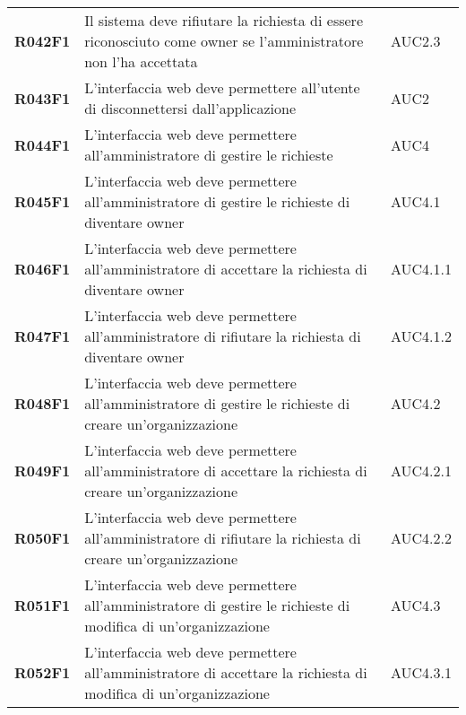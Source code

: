 \documentclass[../analisi-dei-requisiti.tex]{subfiles}
\begin{document}
\begin{longtable}[H]{>{\centering\bfseries}m{3cm} >{\centering}m{10cm} >{\centering\arraybackslash}m{3cm}}
  R042F1                  & Il sistema deve rifiutare la richiesta di essere riconosciuto come owner se l'amministratore non l'ha accettata                                & AUC2.3                        \\
  R043F1                  & L'interfaccia web deve permettere all'utente di disconnettersi dall'applicazione                                                               & AUC2                          \\
  R044F1                  & L'interfaccia web deve permettere all'amministratore di gestire le richieste                                                                   & AUC4                          \\
  R045F1                  & L'interfaccia web deve permettere all'amministratore di gestire le richieste di diventare owner                                                & AUC4.1                        \\
  R046F1                  & L'interfaccia web deve permettere all'amministratore di accettare la richiesta di diventare owner                                              & AUC4.1.1                      \\
  R047F1                  & L'interfaccia web deve permettere all'amministratore di rifiutare la richiesta di diventare owner                                              & AUC4.1.2                      \\
  R048F1                  & L'interfaccia web deve permettere all'amministratore di gestire le richieste di creare un'organizzazione                                       & AUC4.2                        \\
  R049F1                  & L'interfaccia web deve permettere all'amministratore di accettare la richiesta di creare un'organizzazione                                     & AUC4.2.1                      \\
  R050F1                  & L'interfaccia web deve permettere all'amministratore di rifiutare la richiesta di creare un'organizzazione                                     & AUC4.2.2                      \\
  R051F1                  & L'interfaccia web deve permettere all'amministratore di gestire le richieste di modifica di un'organizzazione                                  & AUC4.3                        \\
  R052F1                  & L'interfaccia web deve permettere all'amministratore di accettare la richiesta di modifica di un'organizzazione                                & AUC4.3.1                      \\

\end{longtable}
\end{document}
